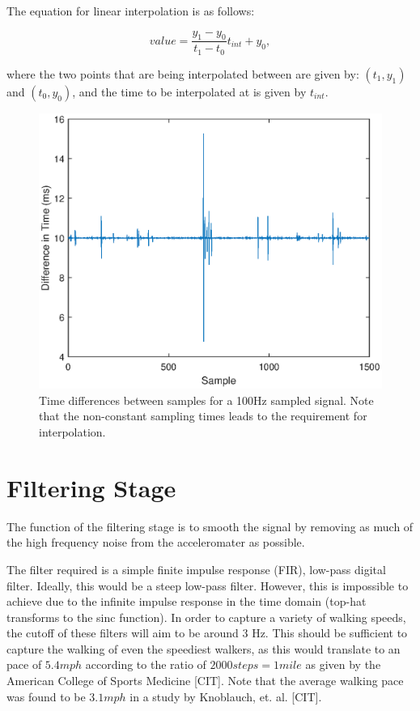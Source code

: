             The equation for linear interpolation is as follows:

            \begin{equation}
                value = \frac{y_1 - y_0}{t_1 - t_0} t_{int} + y_0,
            \end{equation}

            where the two points that are being interpolated between are given by: $(t_1, y_1)$ and $(t_0, y_0)$, and the time to be interpolated at is given by $t_{int}$.

            \begin{figure}[h]
                \includegraphics[width=\textwidth]{Images/sampling_freq.eps}
                \centering
                \caption{Time differences between samples for a 100Hz sampled signal. Note that the non-constant sampling times leads to the requirement for interpolation.}
                \label{img_sampling_freq}
            \end{figure}

        \section{Filtering Stage}

            The function of the filtering stage is to smooth the signal by removing as much of the high frequency noise from the acceleromater as possible.

            The filter required is a simple finite impulse response (FIR), low-pass digital filter. Ideally, this would be a steep low-pass filter. However, this is impossible to achieve due to the infinite impulse response in the time domain (top-hat transforms to the sinc function). In order to capture a variety of walking speeds, the cutoff of these filters will aim to be around 3 Hz. This should be sufficient to capture the walking of even the speediest walkers, as this would translate to an pace of $5.4 mph$ according to the ratio of $2000 steps = 1 mile$ as given by the American College of Sports Medicine [CIT]. Note that the average walking pace was found to be $3.1 mph$ in a study by Knoblauch, et. al. [CIT].

